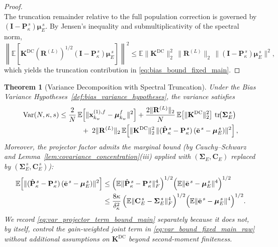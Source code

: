 \documentclass[11pt,a4paper]{article}
\newtheorem{theorem}{Theorem}
\begin{document}
\begin{proof}
\begin{equation}
\end{equation}
	The truncation remainder relative to the full population correction is governed by $(\mathbf{I}-\mathbf{P}_\kappa^{\,s})\boldsymbol{\mu}_E^{\,s}$. By Jensen's inequality and submultiplicativity of the spectral norm,
\begin{equation}
	\left\|\mathbb{E}\!\left[\mathbf{K}^{\mathrm{DC}}(\mathbf{R}^{(L)})^{1/2}(\mathbf{I}-\mathbf{P}_\kappa^{\,s})\boldsymbol{\mu}_E^{\,s}\right]\right\|^2
	\le
	\mathbb{E}\|\mathbf{K}^{\mathrm{DC}}\|_2^2\,\|\mathbf{R}^{(L)}\|_2\,\|(\mathbf{I}-\mathbf{P}_\kappa^{\,s})\boldsymbol{\mu}_E^{\,s}\|^2,
\end{equation}
	which yields the truncation contribution in \eqref{eq:bias_bound_fixed_main}.
	\end{proof}


\begin{theorem}[Variance Decomposition with Spectral Truncation]
\label{thm:variance_decomposition}Under the Bias Variance Hypotheses~\ref{def:bias_variance_hypotheses}, the variance satisfies
\begin{align}
\mathrm{Var}(N,\kappa,s)
&\le
\frac{2}{N}\,\mathbb{E}\!\left[\|\mathbf{x}_{k_w}^{(1),f}-\boldsymbol{\mu}_{k_w}^f\|^2\right]
+
\frac{2\|\mathbf{R}^{(L)}\|_2}{N}\,
\mathbb{E}\!\left[\|\mathbf{K}^{\mathrm{DC}}\|_2^2\right]\,
\mathrm{tr}\!\bigl(\boldsymbol{\Sigma}_E^{\,s}\bigr)
\nonumber\\
&\hspace{3.2em}
+\;
2\|\mathbf{R}^{(L)}\|_2\,
\mathbb{E}\!\left[\|\mathbf{K}^{\mathrm{DC}}\|_2^2\,
\|(\hat{\mathbf{P}}_\kappa^{\,s}-\mathbf{P}_\kappa^{\,s})\,(\bar{\mathbf{e}}^{\,s}-\boldsymbol{\mu}_E^{\,s})\|^2\right],
\label{eq:var_bound_fixed_main_raw}
\end{align}
Moreover, the projector factor admits the marginal bound (by Cauchy--Schwarz and Lemma~\ref{lem:covariance_concentration}(iii) applied with $(\boldsymbol{\Sigma}_E,\mathbf{C}_E)$ replaced by $(\boldsymbol{\Sigma}_E^{\,s},\mathbf{C}_E^{\,s})$):
\begin{align}
\mathbb{E}\!\left[\|(\hat{\mathbf{P}}_\kappa^{\,s}-\mathbf{P}_\kappa^{\,s})\,(\bar{\mathbf{e}}^{\,s}-\boldsymbol{\mu}_E^{\,s})\|^2\right]
&\le
\Bigl(\mathbb{E}\|\hat{\mathbf{P}}_\kappa^{\,s}-\mathbf{P}_\kappa^{\,s}\|_F^4\Bigr)^{1/2}
\Bigl(\mathbb{E}\|\bar{\mathbf{e}}^{\,s}-\boldsymbol{\mu}_E^{\,s}\|^4\Bigr)^{1/2}
\nonumber\\
&\le
\frac{8\kappa}{\delta_\kappa^2}\,
\Bigl(\mathbb{E}\|\mathbf{C}_E^{\,s}-\boldsymbol{\Sigma}_E^{\,s}\|_F^4\Bigr)^{1/2}
\Bigl(\mathbb{E}\|\bar{\mathbf{e}}^{\,s}-\boldsymbol{\mu}_E^{\,s}\|^4\Bigr)^{1/2}.
\label{eq:var_projector_term_bound_main}
\end{align}
We record \eqref{eq:var_projector_term_bound_main} separately because it does not, by itself, control the gain-weighted joint term in \eqref{eq:var_bound_fixed_main_raw} without additional assumptions on $\mathbf{K}^{\mathrm{DC}}$ beyond second-moment finiteness.
\end{theorem}
\end{document}
